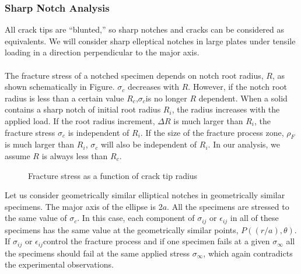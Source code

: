 \documentclass[12pt]{article}
\begin{document}
\subsubsection{Sharp Notch Analysis}
All crack tips are “blunted,” so sharp notches and cracks can be considered as equivalents. We will
consider sharp elleptical notches in large plates under tensile loading in a direction perpendicular to the
major axis.\\\\
The fracture stress of a notched specimen depends on notch root radius, $R$, as shown schematically
in Figure. $\sigma_c$ decreases with $R$. However, if the notch root radius is less than a certain value $R_c$,$\sigma_c$is no
longer $R$ dependent. When a solid contains a sharp notch of initial root radius $R_i$, the radius increases
with the applied load. If the root radius increment, $\Delta R$ is much larger than $R_i$, the fracture stress $\sigma_c$ is
independent of $R_i$. If the size of the fracture process zone, $\rho_F$ is much larger than $R_i$, $\sigma_c$ will also be
independent of $R_i$. In our analysis, we assume $R$ is always less than $R_c$.

\begin{figure}[H]
    \centering
    \captionsetup{labelformat=empty}
    \caption{Fracture stress as a function of crack tip radius}
\end{figure}

Let us consider geometrically similar elliptical notches in geometrically similar specimens. The major
axis of the ellipse is 2$a$. All the specimens are stressed to the same value of $\sigma_c$. In this case, each
component of $\sigma_{ij}$ or $\epsilon_{ij}$ in all of these specimens has the same value at the geometrically similar points,
$P((r/a), \theta)$. If $\sigma_{ij}$ or $\epsilon_{ij} $control the fracture process and if one specimen fails at a given $\sigma_\infty$ all the
specimens should fail at the same applied stress $\sigma_\infty$, which again contradicts the experimental observations.
\end{document}
